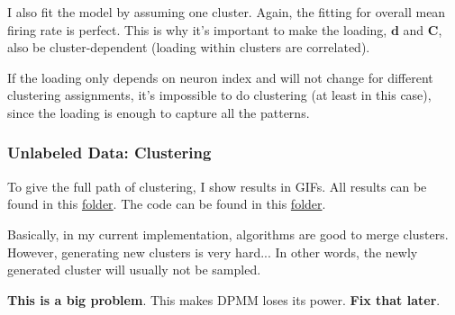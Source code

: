 \documentclass[]{article}
\begin{document}
%
%

I also fit the model by assuming one cluster. Again, the fitting for overall mean firing rate is perfect. This is why it's important to make the loading, \(\mathbf{d}\) and \(\mathbf{C}\), also be cluster-dependent (loading within clusters are correlated).

If the loading only depends on neuron index and will not change for different clustering assignments, it's impossible to do clustering (at least in this case), since the loading is enough to capture all the patterns.


\subsubsection{Unlabeled Data: Clustering}
To give the full path of clustering, I show results in GIFs. All results can be found in this \href{https://github.com/weigcdsb/state-space-clustering/tree/main/results/gif}{folder}. The code can be found in this \href{https://github.com/weigcdsb/state-space-clustering/tree/main/LDS/blkDiag}{folder}.

Basically, in my current implementation, algorithms are good to merge clusters. However, generating new clusters is very hard... In other words, the newly generated cluster will usually not be sampled.

\textbf{This is a big problem}. This makes DPMM loses its power. \textbf{Fix that later}.
\end{document}
